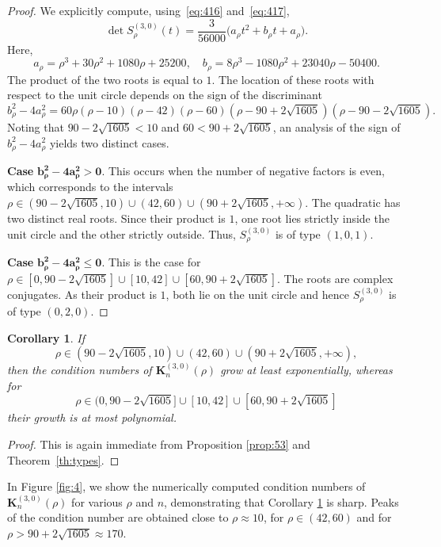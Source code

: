 \documentclass[addpoints,12pt,letter]{article}
\newcommand{\nf}{\infty}
\newcommand{\SR}{S}
\renewcommand{\le}{\leqslant}
\numberwithin{equation}{section}
\newtheorem{corollary}[lemma]{Corollary}
\theoremstyle{definition}
\begin{document}
\begin{proof}
We explicitly compute, using~\eqref{eq:416} and~\eqref{eq:417},
\[
\det \SR_{\rho}^{(3,0)}(t)=\frac{3}{56000}\big(a_{\rho} t^{2}+b_{\rho} t+a_{\rho}\big).
\]
Here,
\[
a_{\rho}=\rho^{3}+30\rho^{2}+1080\rho+25200,\quad b_{\rho}=8\rho^{3}-1080\rho^{2}+23040\rho-50400.
\]
The product of the two roots is equal to $1$.
The location of these roots with respect to the unit circle depends on the sign of the discriminant
\[
b_{\rho}^{2}-4a_{\rho}^{2}=60\rho(\rho-10)(\rho-42)(\rho-60)(\rho-90+2\sqrt{1605})(\rho-90-2\sqrt{1605}).
\]
Noting that $90-2\sqrt{1605}<10$ and $60<90+2\sqrt{1605}$, an analysis of the sign of $b_{\rho}^{2}-4a_{\rho}^{2}$ yields two distinct cases.
\smallskip

\noindent
\textbf{Case} $\boldsymbol{b_{\rho}^{2}-4a_{\rho}^{2}>0.}$
This occurs when the number of negative factors is even, which corresponds to the intervals $\rho\in (90-2\sqrt{1605},10)\cup (42,60)\cup (90+2\sqrt{1605},+\nf)$.
The quadratic has two distinct real roots.
Since their product is $1$, one root lies strictly inside the unit circle and the other strictly outside.
Thus, $\SR_{\rho}^{(3,0)}$ is of type $(1,0,1)$.
\smallskip

\noindent
\textbf{Case} $\boldsymbol{b_{\rho}^{2}-4a_{\rho}^{2}\le 0.}$
This is the case for $\rho\in [0,90-2\sqrt{1605}]\cup [10,42]\cup [60,90+2\sqrt{1605}]$.
The roots are complex conjugates.
As their product is $1$, both lie on the unit circle and hence $\SR_{\rho}^{(3,0)}$ is of type $(0,2,0)$.
\end{proof}



\begin{corollary} \label{cor:54}
If
\[
\rho\in (90-2\sqrt{1605},10)\cup (42,60)\cup (90+2\sqrt{1605},+\nf),
\]
then the condition numbers of $\mathbf{K}_{n}^{(3,0)}(\rho)$ grow at least exponentially, whereas for
\[
\rho\in (0,90-2\sqrt{1605}]\cup [10,42]\cup [60,90+2\sqrt{1605}]
\]
their growth is at most polynomial.
\end{corollary}

\begin{proof}
This is again immediate from Proposition \ref{prop:53} and Theorem~\ref{th:types}.
\end{proof}


In Figure \ref{fig:4}, we show the numerically computed condition numbers of $\mathbf{K}_n^{(3,0)}(\rho)$ for various $\rho$ and $n$, demonstrating that Corollary \ref{cor:54} is sharp. Peaks of the condition number are obtained close to $\rho \approx 10$, for $\rho \in (42,60)$ and for $\rho > 90 + 2\sqrt{1605} \approx 170$.
\end{document}
